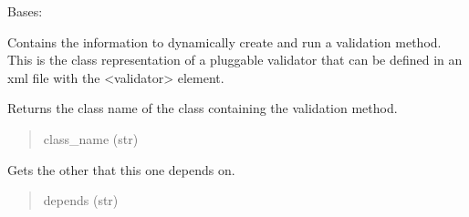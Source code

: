 \documentclass[letterpaper,10pt,english]{sphinxmanual}
\begin{document}
\begin{fulllineitems}
\label{\detokenize{apache_commons_validator_python:apache_commons_validator_python.validator_action_new.ValidatorAction}}
\pysigstartsignatures
{}
\pysigstopsignatures
\sphinxAtStartPar
Bases: 

\sphinxAtStartPar
Contains the information to dynamically create and run a validation method.
This is the class representation of a pluggable validator that can be defined in
an xml file with the \textless{}validator\textgreater{} element.

\begin{fulllineitems}
\label{\detokenize{apache_commons_validator_python:apache_commons_validator_python.validator_action_new.ValidatorAction.class_name}}
\pysigstartsignatures
{}
\pysigstopsignatures
\sphinxAtStartPar
Returns the class name of the class containing
the validation method.
\begin{quote}\begin{description}
\sphinxAtStartPar
class\_name (str)

\end{description}\end{quote}

\end{fulllineitems}


\begin{fulllineitems}
\label{\detokenize{apache_commons_validator_python:apache_commons_validator_python.validator_action_new.ValidatorAction.depends}}
\pysigstartsignatures
{}
\pysigstopsignatures
\sphinxAtStartPar
Gets the other  that this one depends on.
\begin{quote}\begin{description}
\sphinxAtStartPar
depends (str)


\end{description}
\end{quote}
\end{fulllineitems}
\end{fulllineitems}
\end{document}
